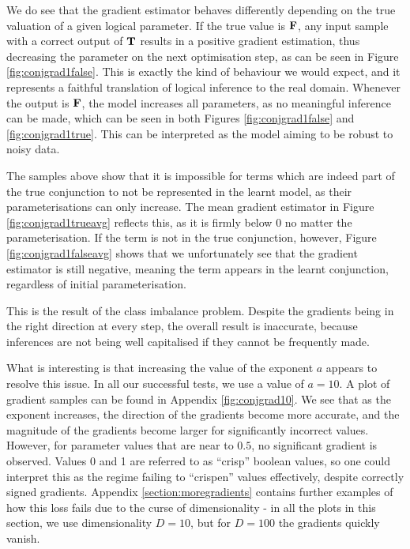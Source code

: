 We do see that the gradient estimator behaves differently depending on the true valuation of a given logical parameter. If the true value is $\textbf{F}$, any input sample with a correct output of $\textbf{T}$ results in a positive gradient estimation, thus decreasing the parameter on the next optimisation step, as can be seen in Figure \ref{fig:conjgrad1false}. This is exactly the kind of behaviour we would expect, and it represents a faithful translation of logical inference to the real domain. Whenever the output is $\textbf{F}$, the model increases all parameters, as no meaningful inference can be made, which can be seen in both Figures \ref{fig:conjgrad1false} and \ref{fig:conjgrad1true}. This can be interpreted as the model aiming to be robust to noisy data. 

The samples above show that it is impossible for terms which are indeed part of the true conjunction to not be represented in the learnt model, as their parameterisations can only increase. The mean gradient estimator in Figure \ref{fig:conjgrad1trueavg} reflects this, as it is firmly below 0 no matter the parameterisation. If the term is not in the true conjunction, however, Figure \ref{fig:conjgrad1falseavg} shows that we unfortunately see that the gradient estimator is still negative, meaning the term appears in the learnt conjunction, regardless of initial parameterisation. 

This is the result of the class imbalance problem. Despite the gradients being in the right direction at every step, the overall result is inaccurate, because inferences are not being well capitalised if they cannot be frequently made.

What is interesting is that increasing the value of the exponent $a$ appears to resolve this issue. In all our successful tests, we use a value of $a=10$. A plot of gradient samples can be found in Appendix \ref{fig:conjgrad10}. We see that as the exponent increases, the direction of the gradients become more accurate, and the magnitude of the gradients become larger for significantly incorrect values. However, for parameter values that are near to $0.5$, no significant gradient is observed. Values 0 and 1 are referred to as ``crisp'' boolean values, so one could interpret this as the regime failing to ``crispen'' values effectively, despite correctly signed gradients. Appendix \ref{section:moregradients} contains further examples of how this loss fails due to the curse of dimensionality - in all the plots in this section, we use dimensionality $D=10$, but for $D=100$ the gradients quickly vanish.

